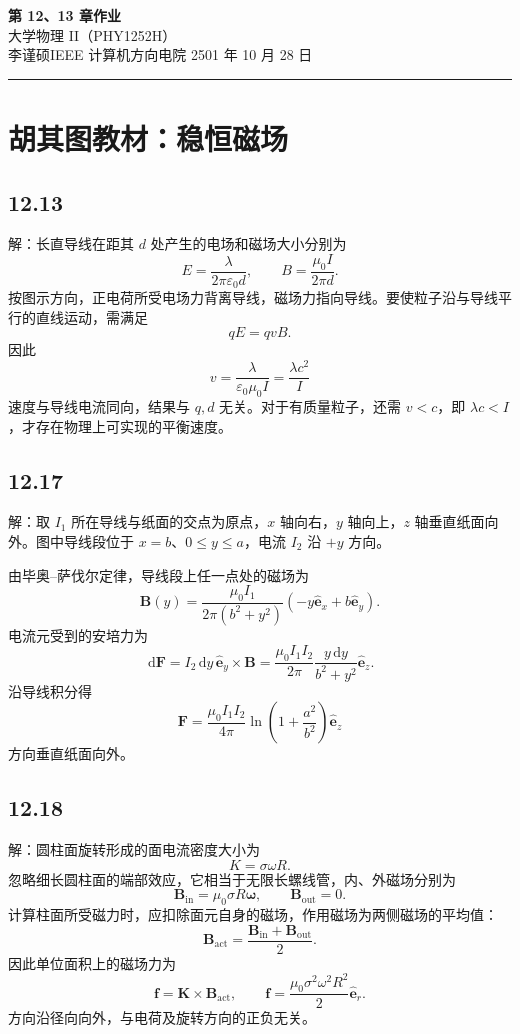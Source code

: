 \documentclass[UTF8,a4paper,12pt]{ctexart}
\newcommand{\dd}{\,\mathrm{d}}
\newcommand{\ez}{\hat{\bm e}_z}
\newcommand{\er}{\hat{\bm e}_r}
\begin{document}
\begin{center}
  {\LARGE\bfseries 第 12、13 章作业}\\[0.55em]
  {\normalsize 大学物理 II（PHY1252H）}\\[0.95em]
  {\small 李谨硕\quad IEEE 计算机方向\quad 电院 2501 年 10 月 28 日}
\end{center}
\vspace{-0.2em}
{\centering\textcolor{black!30}{\rule{0.9\textwidth}{0.8pt}}\par}
\vspace{0.6em}

\section*{胡其图教材：稳恒磁场}

\subsection*{12.13}

解：长直导线在距其 $d$ 处产生的电场和磁场大小分别为
\[
E=\frac{\lambda}{2\pi\varepsilon_0d},
\qquad B=\frac{\mu_0 I}{2\pi d}.
\]
按图示方向，正电荷所受电场力背离导线，磁场力指向导线。要使粒子沿与导线平行的直线运动，需满足
\[
qE=qvB.
\]
因此
\[
\boxed{v=\frac{\lambda}{\varepsilon_0\mu_0I}
=\frac{\lambda c^2}{I}}
\]
速度与导线电流同向，结果与 $q,d$ 无关。对于有质量粒子，还需 $v<c$，即 $\lambda c<I$，才存在物理上可实现的平衡速度。

\subsection*{12.17}

解：取 $I_1$ 所在导线与纸面的交点为原点，$x$ 轴向右，$y$ 轴向上，$z$ 轴垂直纸面向外。图中导线段位于 $x=b$、$0\leq y\leq a$，电流 $I_2$ 沿 $+y$ 方向。

由毕奥--萨伐尔定律，导线段上任一点处的磁场为
\[
\bm B(y)=\frac{\mu_0 I_1}{2\pi(b^2+y^2)}
\left(-y\hat{\bm e}_x+b\hat{\bm e}_y\right).
\]
电流元受到的安培力为
\[
\dd\bm F=I_2\dd y\,\hat{\bm e}_y\times\bm B
=\frac{\mu_0I_1I_2}{2\pi}\frac{y\dd y}{b^2+y^2}\ez.
\]
沿导线积分得
\[
\boxed{\bm F=\frac{\mu_0I_1I_2}{4\pi}
\ln\!\left(1+\frac{a^2}{b^2}\right)\ez}
\]
方向垂直纸面向外。

\subsection*{12.18}

解：圆柱面旋转形成的面电流密度大小为
\[
K=\sigma\omega R.
\]
忽略细长圆柱面的端部效应，它相当于无限长螺线管，内、外磁场分别为
\[
\bm B_{\mathrm{in}}=\mu_0\sigma R\bm\omega,
\qquad \bm B_{\mathrm{out}}=0.
\]
计算柱面所受磁力时，应扣除面元自身的磁场，作用磁场为两侧磁场的平均值：
\[
\bm B_{\mathrm{act}}=
\frac{\bm B_{\mathrm{in}}+\bm B_{\mathrm{out}}}{2}.
\]
因此单位面积上的磁场力为
\[
\bm f=\bm K\times\bm B_{\mathrm{act}},
\qquad
\boxed{\bm f=\frac{\mu_0\sigma^2\omega^2R^2}{2}\er}.
\]
方向沿径向向外，与电荷及旋转方向的正负无关。
\end{document}
